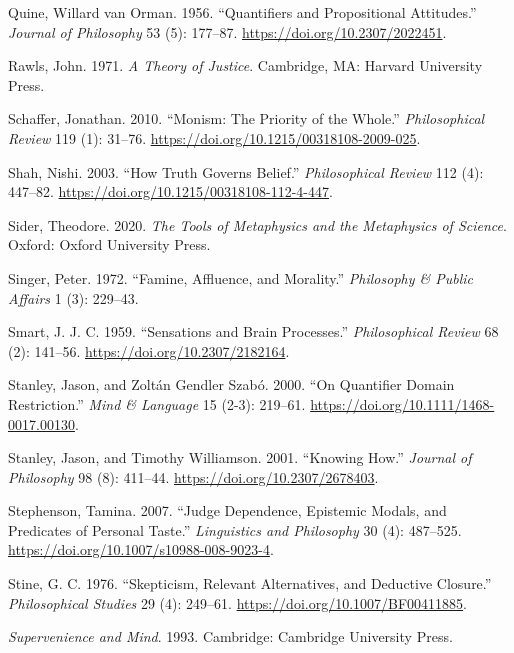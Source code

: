 \documentclass[
  12pt,
  letterpaper,
  DIV=11,
  numbers=noendperiod]{scrartcl}
\newlength{\cslhangindent}
\newenvironment{CSLReferences}[2] %
 {\begin{list}{}{%
  \setlength{\itemindent}{0pt}
  \setlength{\leftmargin}{0pt}
  \setlength{\parsep}{0pt}
  \ifodd #1
   \setlength{\leftmargin}{\cslhangindent}
   \setlength{\itemindent}{-1\cslhangindent}
  \fi
  \setlength{\itemsep}{#2\baselineskip}}}
 {\end{list}}
\begin{document}
\begin{CSLReferences}{1}{0}
Quine, Willard van Orman. 1956. {``Quantifiers and Propositional
Attitudes.''} \emph{Journal of Philosophy} 53 (5): 177--87.
\url{https://doi.org/10.2307/2022451}.

Rawls, John. 1971. \emph{A Theory of Justice}. Cambridge, MA: Harvard
University Press.

Schaffer, Jonathan. 2010. {``Monism: The Priority of the Whole.''}
\emph{Philosophical Review} 119 (1): 31--76.
\url{https://doi.org/10.1215/00318108-2009-025}.

Shah, Nishi. 2003. {``How Truth Governs Belief.''} \emph{Philosophical
Review} 112 (4): 447--82.
\url{https://doi.org/10.1215/00318108-112-4-447}.

Sider, Theodore. 2020. \emph{The Tools of Metaphysics and the
Metaphysics of Science}. Oxford: Oxford University Press.

Singer, Peter. 1972. {``Famine, Affluence, and Morality.''}
\emph{Philosophy \& Public Affairs} 1 (3): 229--43.

Smart, J. J. C. 1959. {``Sensations and Brain Processes.''}
\emph{Philosophical Review} 68 (2): 141--56.
\url{https://doi.org/10.2307/2182164}.

Stanley, Jason, and Zoltán Gendler Szabó. 2000. {``On Quantifier Domain
Restriction.''} \emph{Mind \& Language} 15 (2-3): 219--61.
\url{https://doi.org/10.1111/1468-0017.00130}.

Stanley, Jason, and Timothy Williamson. 2001. {``Knowing How.''}
\emph{Journal of Philosophy} 98 (8): 411--44.
\url{https://doi.org/10.2307/2678403}.

Stephenson, Tamina. 2007. {``Judge Dependence, Epistemic Modals, and
Predicates of Personal Taste.''} \emph{Linguistics and Philosophy} 30
(4): 487--525. \url{https://doi.org/10.1007/s10988-008-9023-4}.

Stine, G. C. 1976. {``Skepticism, Relevant Alternatives, and Deductive
Closure.''} \emph{Philosophical Studies} 29 (4): 249--61.
\url{https://doi.org/10.1007/BF00411885}.

\emph{Supervenience and Mind}. 1993. Cambridge: {C}ambridge {U}niversity
{P}ress.


\end{CSLReferences}
\end{document}
